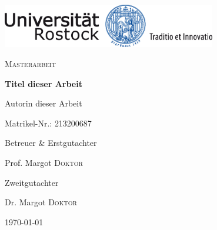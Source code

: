 \documentclass[a4paper, 11pt]{scrartcl}
\begin{document}
	
\begin{titlepage}
	\centering
	\includegraphics[width=0.7\textwidth]{Resources/unirostock.png}\par
	\vspace{3cm}
	{\scshape\Large Masterarbeit \par}
	\vspace{1.5cm}
	{\huge\bfseries Titel dieser Arbeit \par}
	\vspace{3cm}
	{\Large Autorin dieser Arbeit \par}
	{\large Matrikel-Nr.: \textsc{213200687} \par}
	\vspace{3cm}
	Betreuer \& Erstgutachter \par
	Prof. Margot \textsc{Doktor}\par
	\vspace{0.8cm}
	Zweitgutachter \par
	Dr. Margot \textsc{Doktor}
	\vfill
	{\large \today\par}
\end{titlepage}


\pagestyle{empty}
\tableofcontents

\newpage

\pagestyle{empty}
\begin{abstract}
	\blindtext
\end{abstract}
\newpage

\pagestyle{empty}
\begin{danksagung}
	\blindtext
\end{danksagung}

\newpage

\pagestyle{fancy}
\fancyhf{}
\renewcommand{\headrulewidth}{0.1pt}
\renewcommand{\sectionmark}[1]{\markboth{#1}{}}
\fancyhead[R]{\normalfont \thepage}
\fancyhead[L]{\normalfont \leftmark}


\newpage

\pagestyle{fancy}
\fancyhf{}
\renewcommand{\headrulewidth}{0.0pt}
\fancyhead[R]{\normalfont \thepage}


\end{document}
